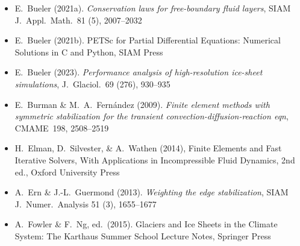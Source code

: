 
\begin{itemize}

\item E.~Bueler (2021a). \emph{Conservation laws for free-boundary fluid layers}, SIAM J.~Appl.~Math.~81 (5), 2007--2032 

\item E.~Bueler (2021b). PETSc for Partial Differential Equations: Numerical Solutions in C and Python, SIAM Press

\item E.~Bueler (2023). \emph{Performance analysis of high-resolution ice-sheet simulations}, J.~Glaciol.~69 (276), 930--935 



\item E.~Burman \& M.~A.~Fern\'andez (2009).  \emph{Finite element methods with symmetric stabilization for the transient convection-diffusion-reaction eqn}, CMAME~198, 2508--2519 

\item H.~Elman, D.~Silvester, \& A.~Wathen (2014), Finite Elements and Fast Iterative Solvers, With Applications in Incompressible Fluid Dynamics, 2nd ed., Oxford University Press

\item A.~Ern \& J.-L.~Guermond (2013). \emph{Weighting the edge stabilization}, SIAM J.~Numer.~Analysis 51 (3), 1655--1677 

\item A.~Fowler \& F.~Ng, ed.~(2015). Glaciers and Ice Sheets in the Climate System: The Karthaus Summer School Lecture Notes, Springer Press


\end{itemize}
